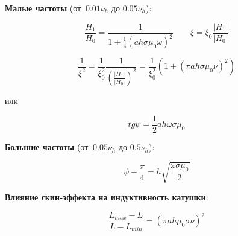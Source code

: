 \documentclass{article}
\begin{document}
\textbf{Малые частоты} (от $~ 0.01\nu_h $ до $0.05\nu_h$):

\begin{equation}
    \frac{H_1}{H_0} = \frac{1}{1+\frac{1}{4}(ah\sigma \mu_0 \omega)^2} \quad \quad \xi = \xi_0  \frac{|H_1|}{|H_0|}
\end{equation}

\begin{equation}
    \frac{1}{\xi^2} = \frac{1}{\xi_0^2} \frac{1}{\left ( \frac{|H_1|}{|H_0|} \right )^2 } = \frac{1}{\xi_0^2} \left ( 1 + (\pi ah\sigma \mu_0 \nu)^2\right )
\end{equation}

или

\begin{equation}
    tg\psi = \frac{1}{2}ah\omega \sigma \mu_0
\end{equation}

\textbf{Большие частоты} (от $~ 0.05\nu_h $ до $0.5\nu_h$):

\begin{equation}
    \psi - \frac{\pi}{4} = h\sqrt{\frac{\omega \sigma \mu_0}{2}}
\end{equation}

\textbf{Влияние скин-эффекта на индуктивность катушки}:

\begin{equation}
    \frac{L_{max} - L_{}}{L - L_{min}} = (\pi a h \mu_0 \sigma \nu)^2
\end{equation}







\end{document}
